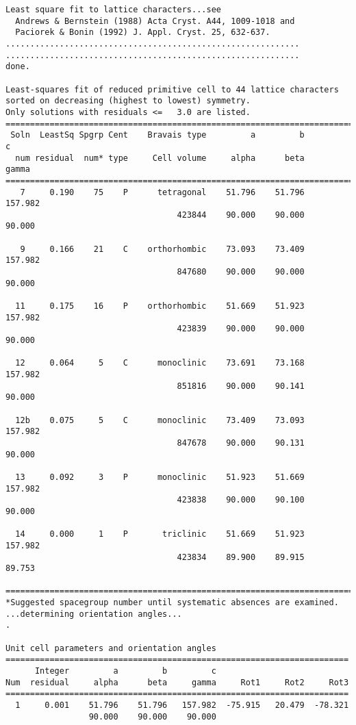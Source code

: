 \documentclass[a4paper, 11pt]{article}
\begin{document}
{\begin{verbatim}
Least square fit to lattice characters...see
  Andrews & Bernstein (1988) Acta Cryst. A44, 1009-1018 and
  Paciorek & Bonin (1992) J. Appl. Cryst. 25, 632-637.
............................................................
............................................................
done.

Least-squares fit of reduced primitive cell to 44 lattice characters
sorted on decreasing (highest to lowest) symmetry.
Only solutions with residuals <=   3.0 are listed.
=======================================================================
 Soln  LeastSq Spgrp Cent    Bravais type         a         b         c
  num residual  num* type     Cell volume     alpha      beta     gamma
=======================================================================
   7     0.190    75    P      tetragonal    51.796    51.796   157.982
                                   423844    90.000    90.000    90.000

   9     0.166    21    C    orthorhombic    73.093    73.409   157.982
                                   847680    90.000    90.000    90.000

  11     0.175    16    P    orthorhombic    51.669    51.923   157.982
                                   423839    90.000    90.000    90.000

  12     0.064     5    C      monoclinic    73.691    73.168   157.982
                                   851816    90.000    90.141    90.000

  12b    0.075     5    C      monoclinic    73.409    73.093   157.982
                                   847678    90.000    90.131    90.000

  13     0.092     3    P      monoclinic    51.923    51.669   157.982
                                   423838    90.000    90.100    90.000

  14     0.000     1    P       triclinic    51.669    51.923   157.982
                                   423834    89.900    89.915    89.753

=======================================================================
*Suggested spacegroup number until systematic absences are examined.
...determining orientation angles...
.

Unit cell parameters and orientation angles
======================================================================
      Integer         a         b         c
Num  residual     alpha      beta     gamma     Rot1     Rot2     Rot3
======================================================================
  1     0.001    51.796    51.796   157.982  -75.915   20.479  -78.321
                 90.000    90.000    90.000


\end{verbatim}}
\end{document}
